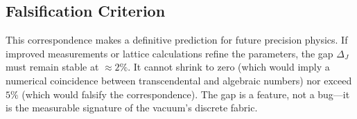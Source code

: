 \subsection{Falsification Criterion}
This correspondence makes a definitive prediction for future precision physics. If improved measurements or lattice calculations refine the parameters, the gap $\Delta_J$ must remain stable at $\approx 2\%$. It cannot shrink to zero (which would imply a numerical coincidence between transcendental and algebraic numbers) nor exceed $5\%$ (which would falsify the correspondence). The gap is a feature, not a bug—it is the measurable signature of the vacuum's discrete fabric.